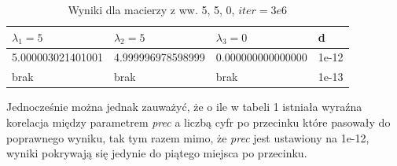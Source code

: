\documentclass[a4paper,12pt]{article}
\begin{document}
\begin{table}[H]
    \centering
\begin{tabular}{|l|l|l|l|}
\hline
$\lambda_1 = 5$                & $\lambda_2 = 5$                 & $\lambda_3 = 0$                 & d      \\
\hline
5.000003021401001 & 4.999996978598999 & 0.000000000000000 & 1e-12 \\
\hline
brak              & brak              & brak              & 1e-13 \\
\hline
\end{tabular}
   \footnotesize \caption{Wyniki dla macierzy z ww. 5, 5, 0, $iter = 3e6$}
    \label{tab:my_label3}
\end{table}
\vspace{-6mm}%
Jednocześnie można jednak zauważyć, że o ile w tabeli 1 istniała wyraźna korelacja między parametrem \emph{prec} a liczbą cyfr po przecinku które pasowały do poprawnego wyniku, tak tym razem mimo, że \emph{prec} jest ustawiony na 1e-12, wyniki pokrywają się jedynie do piątego miejsca po przecinku.
\end{document}

